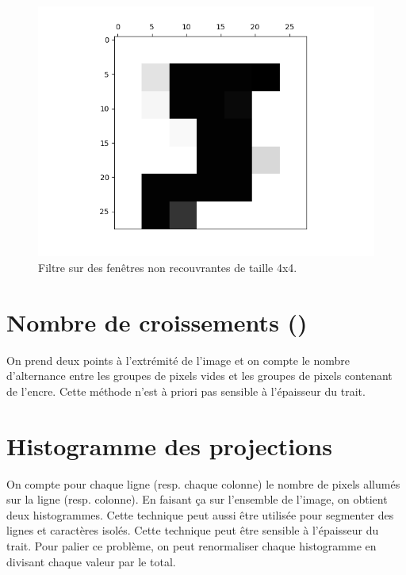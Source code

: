 \begin{figure}
  \centering
  \includegraphics[scale=0.4]{assets/zoning-training-0-max}
  \caption{Filtre  sur des fenêtres non recouvrantes de taille 4x4.}
  \label{fig:zoning-max}
\end{figure}




\section{Nombre de croissements ()}



On prend deux points à l’extrémité de l’image et on compte le nombre d’alternance 
entre les groupes de pixels vides et les groupes de pixels contenant de l’encre. 
Cette méthode n’est à priori pas sensible à l’épaisseur du trait.



\section{Histogramme des projections}



On compte pour chaque ligne (resp. chaque colonne) le nombre de pixels allumés sur 
la ligne (resp. colonne). 
En faisant ça sur l’ensemble de l’image, on obtient deux histogrammes. 
Cette technique peut aussi être utilisée pour segmenter des lignes et caractères isolés. 
Cette technique peut être sensible à l’épaisseur du trait. 
Pour palier ce problème, on peut renormaliser chaque histogramme en divisant 
chaque valeur par le total.

